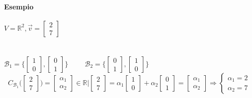 \paragraph{Esempio} $V=\mathbb{R}^2, \vec{v}= 
\begin{bmatrix}
    2\\7
\end{bmatrix}$\\
\\
\\
$\mathcal{B}_1=\Bigg\{
\begin{bmatrix}
    1\\0
\end{bmatrix}
,
\begin{bmatrix}
    0\\1
\end{bmatrix}
\Bigg\}
\hspace{1cm}
\mathcal{B}_2=\Bigg\{
\begin{bmatrix}
    0\\1
\end{bmatrix}
,
\begin{bmatrix}
    1\\0
\end{bmatrix}
\Bigg\}
$\\

\[
    C_{\mathcal{B}_1}\Bigg( 
    \begin{bmatrix}  
        2\\7
    \end{bmatrix}  
    \Bigg)
    = 
    \begin{bmatrix}
        \alpha_1\\
        \alpha_2
    \end{bmatrix}
    \in\mathbb{R}\Big| 
    \begin{bmatrix}
        2\\7
    \end{bmatrix}
    =\alpha_1
    \begin{bmatrix}
        1\\0
    \end{bmatrix}
    +\alpha_2
    \begin{bmatrix}
        0\\1
    \end{bmatrix}
    = 
    \begin{bmatrix}
        \alpha_1\\\alpha_2
    \end{bmatrix}
    \Longrightarrow
    \begin{cases}
        \alpha_1=2\\
        \alpha_2=7
    \end{cases}
\]

